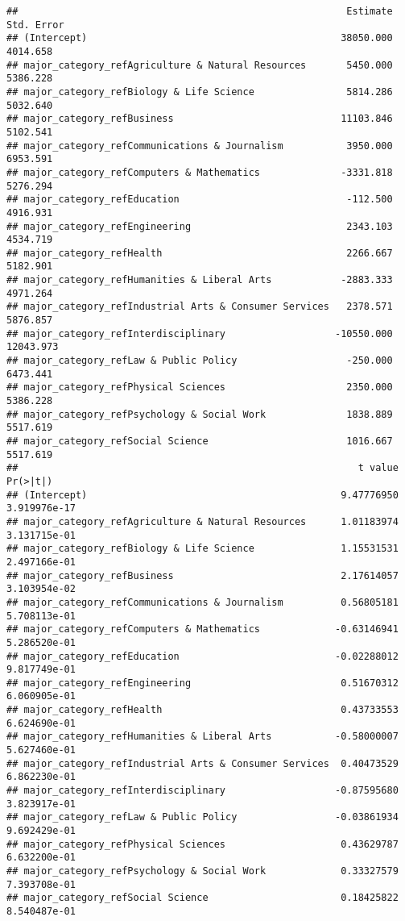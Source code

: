 \documentclass[
]{article}
\begin{document}
\begin{verbatim}
##                                                         Estimate Std. Error
## (Intercept)                                            38050.000   4014.658
## major_category_refAgriculture & Natural Resources       5450.000   5386.228
## major_category_refBiology & Life Science                5814.286   5032.640
## major_category_refBusiness                             11103.846   5102.541
## major_category_refCommunications & Journalism           3950.000   6953.591
## major_category_refComputers & Mathematics              -3331.818   5276.294
## major_category_refEducation                             -112.500   4916.931
## major_category_refEngineering                           2343.103   4534.719
## major_category_refHealth                                2266.667   5182.901
## major_category_refHumanities & Liberal Arts            -2883.333   4971.264
## major_category_refIndustrial Arts & Consumer Services   2378.571   5876.857
## major_category_refInterdisciplinary                   -10550.000  12043.973
## major_category_refLaw & Public Policy                   -250.000   6473.441
## major_category_refPhysical Sciences                     2350.000   5386.228
## major_category_refPsychology & Social Work              1838.889   5517.619
## major_category_refSocial Science                        1016.667   5517.619
##                                                           t value     Pr(>|t|)
## (Intercept)                                            9.47776950 3.919976e-17
## major_category_refAgriculture & Natural Resources      1.01183974 3.131715e-01
## major_category_refBiology & Life Science               1.15531531 2.497166e-01
## major_category_refBusiness                             2.17614057 3.103954e-02
## major_category_refCommunications & Journalism          0.56805181 5.708113e-01
## major_category_refComputers & Mathematics             -0.63146941 5.286520e-01
## major_category_refEducation                           -0.02288012 9.817749e-01
## major_category_refEngineering                          0.51670312 6.060905e-01
## major_category_refHealth                               0.43733553 6.624690e-01
## major_category_refHumanities & Liberal Arts           -0.58000007 5.627460e-01
## major_category_refIndustrial Arts & Consumer Services  0.40473529 6.862230e-01
## major_category_refInterdisciplinary                   -0.87595680 3.823917e-01
## major_category_refLaw & Public Policy                 -0.03861934 9.692429e-01
## major_category_refPhysical Sciences                    0.43629787 6.632200e-01
## major_category_refPsychology & Social Work             0.33327579 7.393708e-01
## major_category_refSocial Science                       0.18425822 8.540487e-01
\end{verbatim}
\end{document}
